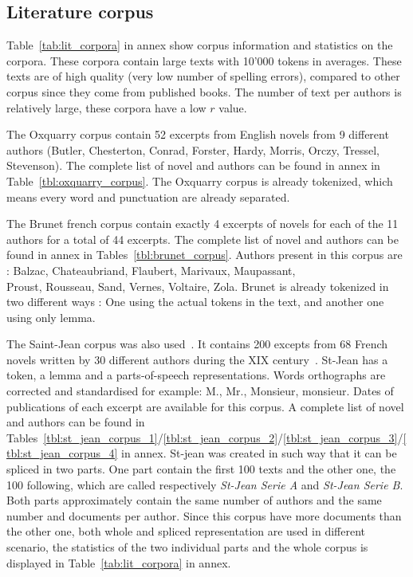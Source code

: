 \subsection{Literature corpus}
\label{sec:lit_corpus}

Table~\ref{tab:lit_corpora} in annex show corpus information and statistics on the corpora.
These corpora contain large texts with 10'000 tokens in averages.
These texts are of high quality (very low number of spelling errors), compared to other corpus since they come from published books.
The number of text per authors is relatively large, these corpora have a low $r$ value.

The Oxquarry corpus contain 52 excerpts from English novels from 9 different authors (Butler, Chesterton, Conrad, Forster, Hardy, Morris, Orczy, Tressel, Stevenson).
The complete list of novel and authors can be found in annex in Table~\ref{tbl:oxquarry_corpus}.
The Oxquarry corpus is already tokenized, which means every word and punctuation are already separated.

The Brunet french corpus contain exactly 4 excerpts of novels for each of the 11 authors for a total of 44 excerpts.
The complete list of novel and authors can be found in annex in Tables~\ref{tbl:brunet_corpus}.
Authors present in this corpus are : Balzac, Chateaubriand, Flaubert, Marivaux, Maupassant, \\
Proust, Rousseau, Sand, Vernes, Voltaire, Zola.
Brunet is already tokenized in two different ways : One using the actual tokens in the text, and another one using only lemma.

The Saint-Jean corpus was also used~\cite{unine_corpus}.
It contains 200 excepts from 68 French novels written by 30 different authors during the XIX century~\cite{st_jean}.
St-Jean has a token, a lemma and a parts-of-speech representations.
Words orthographs are corrected and standardised for example: M., Mr., Monsieur, monsieur.
Dates of publications of each excerpt are available for this corpus.
A complete list of novel and authors can be found in Tables~\ref{tbl:st_jean_corpus_1}/\ref{tbl:st_jean_corpus_2}/\ref{tbl:st_jean_corpus_3}/\ref{tbl:st_jean_corpus_4} in annex.
St-jean was created in such way that it can be spliced in two parts.
One part contain the first 100 texts and the other one, the 100 following, which are called respectively \textit{St-Jean Serie A} and \textit{St-Jean Serie B}.
Both parts approximately contain the same number of authors and the same number and documents per author.
Since this corpus have more documents than the other one, both whole and spliced representation are used in different scenario, the statistics of the two individual parts and the whole corpus is displayed in Table~\ref{tab:lit_corpora} in annex.
